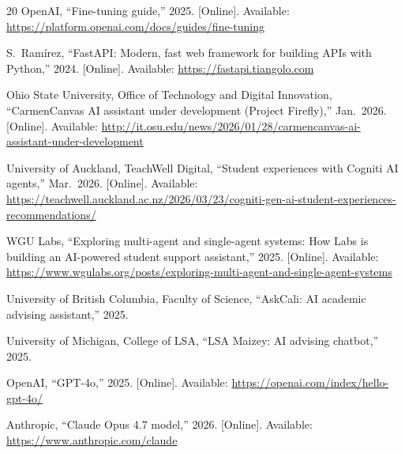 \documentclass[conference]{IEEEtran}
\begin{document}
\begin{thebibliography}{20}
OpenAI,
``Fine-tuning guide,''
2025. [Online]. Available: \url{https://platform.openai.com/docs/guides/fine-tuning}

S.~Ram\'{i}rez,
``FastAPI: Modern, fast web framework for building APIs with Python,''
2024. [Online]. Available: \url{https://fastapi.tiangolo.com}

Ohio State University, Office of Technology and Digital Innovation,
``CarmenCanvas AI assistant under development (Project Firefly),''
Jan.~2026. [Online]. Available:
\url{http://it.osu.edu/news/2026/01/28/carmencanvas-ai-assistant-under-development}

University of Auckland, TeachWell Digital,
``Student experiences with Cogniti AI agents,''
Mar.~2026. [Online]. Available:
\url{https://teachwell.auckland.ac.nz/2026/03/23/cogniti-gen-ai-student-experiences-recommendations/}

WGU Labs,
``Exploring multi-agent and single-agent systems: How Labs is building an AI-powered student support assistant,''
2025. [Online]. Available:
\url{https://www.wgulabs.org/posts/exploring-multi-agent-and-single-agent-systems}

University of British Columbia, Faculty of Science,
``AskCali: AI academic advising assistant,''
2025.

University of Michigan, College of LSA,
``LSA Maizey: AI advising chatbot,''
2025.

OpenAI,
``GPT-4o,''
2025. [Online]. Available: \url{https://openai.com/index/hello-gpt-4o/}

Anthropic,
``Claude Opus 4.7 model,''
2026. [Online]. Available: \url{https://www.anthropic.com/claude}

\end{thebibliography}
\end{document}
